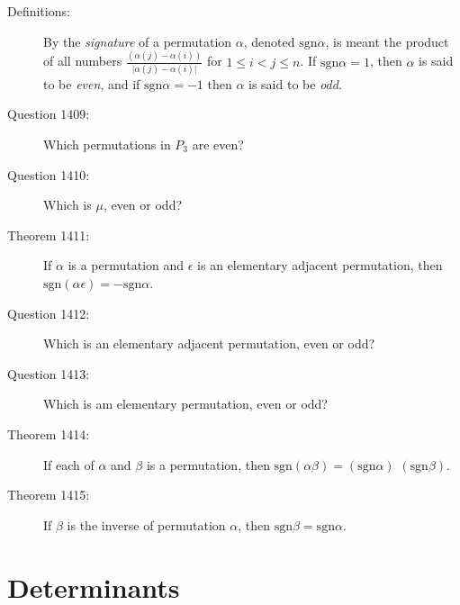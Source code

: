 \documentclass{article}
\begin{document}
\begin{description}
  \item[Definitions:] By the \emph{signature} of a permutation $\alpha$, denoted $\text{sgn} \alpha$, is meant the product of all numbers $\frac{ (\alpha(j)-\alpha(i)) }{  \vert \alpha(j)-\alpha(i) \vert }$ for $1 \leq i < j \leq n$. If $\text{sgn} \alpha = 1$, then $\alpha$ is said to be \emph{even}, and if $\text{sgn} \alpha = -1$ then $\alpha$ is said to be \emph{odd}.

  \item[Question 1409:] Which permutations in $P_{3}$ are even?

  \item[Question 1410:] Which is $\mu$, even or odd?

  \item[Theorem 1411:] If $\alpha$ is a permutation and $\epsilon$ is an elementary adjacent permutation, then $\text{sgn} (\alpha \epsilon) = - \text{sgn} \alpha$.

  \item[Question 1412:] Which is an elementary adjacent permutation, even or odd?

  \item[Question 1413:] Which is am elementary permutation, even or odd?

  \item[Theorem 1414:] If each of $\alpha$ and $\beta$ is a permutation, then $\text{sgn} (\alpha \beta) = (\text{sgn} \alpha)$ $(\text{sgn} \beta)$.

  \item[Theorem 1415:] If $\beta$ is the inverse of permutation $\alpha$, then $\text{sgn} \beta = \text{sgn} \alpha$.

\end{description}


\section{Determinants}
\end{document}
